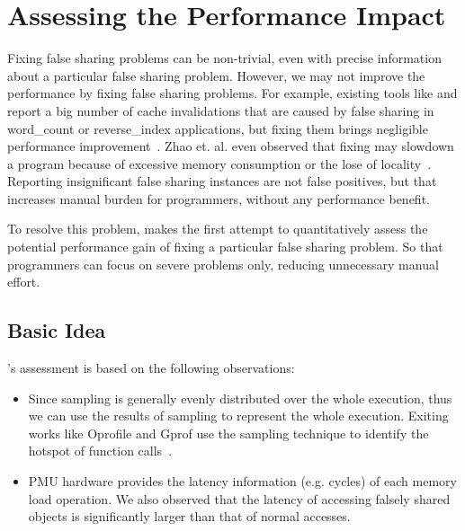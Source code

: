 \section{Assessing the Performance Impact}

\label{sec:predictimprove}

Fixing false sharing problems can be non-trivial, even with precise information about a particular false sharing problem. However, we may not improve the performance by fixing false sharing problems. For example, existing tools like \sheriff{} and \predatory{} report a big number of cache invalidations that are caused by false sharing in word\_count or reverse\_index applications, but fixing them brings negligible performance improvement~\cite{Sheriff, Predatory}. Zhao et. al. even observed that fixing may slowdown a program because of excessive memory consumption or the lose of locality~\cite{qinzhao}. Reporting insignificant false sharing instances are not false positives, but that increases manual burden for programmers, without any performance benefit.

To resolve this problem, \cheetah{} makes the first attempt to quantitatively assess the potential performance gain of fixing a particular false sharing problem. So that programmers can focus on severe problems only, reducing unnecessary manual effort. 

\subsection{Basic Idea}

\cheetah{}'s assessment is based on the following observations:

\begin{itemize}
\item Since sampling is generally evenly distributed over the whole execution, thus we can use the results of sampling to  represent the whole execution. Exiting works like Oprofile and Gprof use the sampling technique to identify the hotspot of function calls~\cite{thompson1975unix,oprofile, DBLP:conf/sigplan/GrahamKM82}. 

\item PMU hardware provides the latency information (e.g. cycles) of each memory load operation. We also observed that the latency of accessing falsely shared objects is significantly larger than that of normal accesses.  

\end{itemize}

